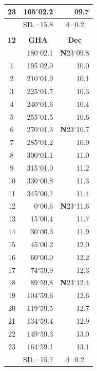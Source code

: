 \documentclass[10pt, a4paper]{report}
\begin{document}
\begin{scriptsize}
\begin{tabular*}{0.2\textwidth}[t]{@{\extracolsep{\fill}}|c|rr|}
23 & 165$^\circ$02.2 & 09.7\\
\hline
\rule{0pt}{2.4ex} & \multicolumn{1}{c}{SD.=15.8} & \multicolumn{1}{c|}{d=0.2}\\
\hline
\multicolumn{1}{c}{}\\[-0.5ex]\hline
\multicolumn{1}{|c|}{\rule{0pt}{2.6ex}\textbf{12}} & \multicolumn{1}{c}{\textbf{GHA}} & \multicolumn{1}{c|}{\textbf{Dec}}\\
\hline\rule{0pt}{2.6ex}\noindent
0 & 180$^\circ$02.1 & \textbf{N}23$^\circ$09.8\\
1 & 195$^\circ$02.0 & 10.0\\
2 & 210$^\circ$01.9 & 10.1\\
3 & 225$^\circ$01.7 & \raisebox{0.24ex}{\boldmath$\cdot$~\boldmath$\cdot$~~}10.3\\
4 & 240$^\circ$01.6 & 10.4\\
5 & 255$^\circ$01.5 & 10.6\\[2Pt]
6 & 270$^\circ$01.3 & \textbf{N}23$^\circ$10.7\\
7 & 285$^\circ$01.2 & 10.9\\
8 & 300$^\circ$01.1 & 11.0\\
9 & 315$^\circ$01.0 & \raisebox{0.24ex}{\boldmath$\cdot$~\boldmath$\cdot$~~}11.2\\
10 & 330$^\circ$00.8 & 11.3\\
11 & 345$^\circ$00.7 & 11.4\\[2Pt]
12 & 0$^\circ$00.6 & \textbf{N}23$^\circ$11.6\\
13 & 15$^\circ$00.4 & 11.7\\
14 & 30$^\circ$00.3 & 11.9\\
15 & 45$^\circ$00.2 & \raisebox{0.24ex}{\boldmath$\cdot$~\boldmath$\cdot$~~}12.0\\
16 & 60$^\circ$00.0 & 12.2\\
17 & 74$^\circ$59.9 & 12.3\\[2Pt]
18 & 89$^\circ$59.8 & \textbf{N}23$^\circ$12.4\\
19 & 104$^\circ$59.6 & 12.6\\
20 & 119$^\circ$59.5 & 12.7\\
21 & 134$^\circ$59.4 & \raisebox{0.24ex}{\boldmath$\cdot$~\boldmath$\cdot$~~}12.9\\
22 & 149$^\circ$59.3 & 13.0\\
23 & 164$^\circ$59.1 & 13.1\\
\hline
\rule{0pt}{2.4ex} & \multicolumn{1}{c}{SD.=15.7} & \multicolumn{1}{c|}{d=0.2}\\
\hline
\end{tabular*}\noindent

\end{scriptsize}
\end{document}
